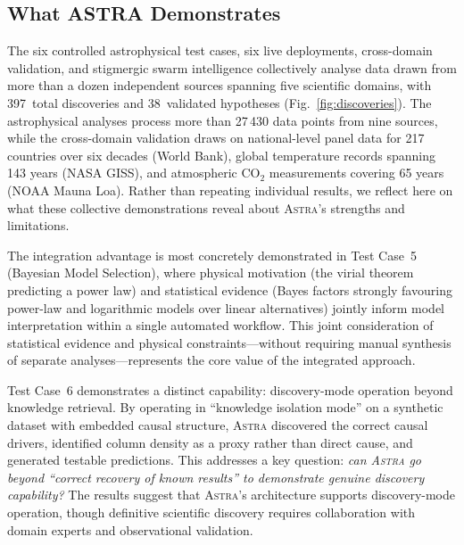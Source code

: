 \documentclass[usenatbib]{rasti}
\newcommand{\astra}{\textsc{Astra}\xspace}
\begin{document}
\subsection{What ASTRA Demonstrates}
\label{sec:discussion:demonstrates}

The six controlled astrophysical test cases, six live deployments, cross-domain validation, and stigmergic swarm intelligence collectively analyse data drawn from more than a dozen independent sources spanning five scientific domains, with 397~total discoveries and 38~validated hypotheses (Fig.~\ref{fig:discoveries}).
The astrophysical analyses process more than 27\,430 data points from nine sources, while the cross-domain validation draws on national-level panel data for 217 countries over six decades (World Bank), global temperature records spanning 143 years (NASA GISS), and atmospheric CO$_{2}$ measurements covering 65 years (NOAA Mauna Loa).
Rather than repeating individual results, we reflect here on what these collective demonstrations reveal about \astra's strengths and limitations.

The integration advantage is most concretely demonstrated in Test Case~5 (Bayesian Model Selection), where physical motivation (the virial theorem predicting a power law) and statistical evidence (Bayes factors strongly favouring power-law and logarithmic models over linear alternatives) jointly inform model interpretation within a single automated workflow.
This joint consideration of statistical evidence and physical constraints---without requiring manual synthesis of separate analyses---represents the core value of the integrated approach.

Test Case~6 demonstrates a distinct capability: discovery-mode operation beyond knowledge retrieval.
By operating in ``knowledge isolation mode'' on a synthetic dataset with embedded causal structure, \astra discovered the correct causal drivers, identified column density as a proxy rather than direct cause, and generated testable predictions.
This addresses a key question: \emph{can \astra go beyond ``correct recovery of known results'' to demonstrate genuine discovery capability?}
The results suggest that \astra's architecture supports discovery-mode operation, though definitive scientific discovery requires collaboration with domain experts and observational validation.
\end{document}

